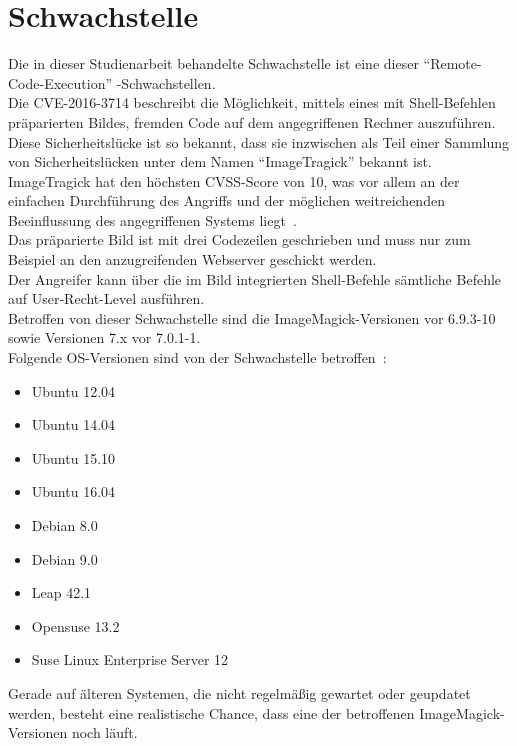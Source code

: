 \section{Schwachstelle}\label{sec:schwachstelle}

Die in dieser Studienarbeit behandelte Schwachstelle ist eine dieser "`Remote-Code-Execution"' -Schwachstellen.\\

Die CVE-2016-3714 beschreibt die Möglichkeit, mittels eines mit Shell-Befehlen präparierten Bildes, fremden Code auf dem angegriffenen Rechner auszuführen.\\

Diese Sicherheitslücke ist so bekannt, dass sie inzwischen als Teil einer Sammlung von Sicherheitslücken unter dem Namen "`ImageTragick"' bekannt ist.\\

ImageTragick hat den höchsten CVSS-Score von 10, was vor allem an der einfachen Durchführung des Angriffs und der möglichen weitreichenden Beeinflussung des angegriffenen Systems liegt~\cite{ImagemagickProductsVulnerabilities}.\\
Das präparierte Bild ist mit drei Codezeilen geschrieben und muss nur zum Beispiel an den anzugreifenden Webserver geschickt werden.\\
Der Angreifer kann über die im Bild integrierten Shell-Befehle sämtliche Befehle auf User-Recht-Level ausführen.\\

Betroffen von dieser Schwachstelle sind die ImageMagick-Versionen vor 6.9.3-10 sowie Versionen 7.x vor 7.0.1-1.\\
Folgende OS-Versionen sind von der Schwachstelle betroffen~\cite{CVE20163714EPHEMERALHTTPS}:
\begin{itemize}
    \item Ubuntu 12.04
    \item Ubuntu 14.04
    \item Ubuntu 15.10
    \item Ubuntu 16.04
    \item Debian 8.0
    \item Debian 9.0
    \item Leap 42.1
    \item Opensuse 13.2
    \item Suse Linux Enterprise Server 12
\end{itemize}
Gerade auf älteren Systemen, die nicht regelmäßig gewartet oder geupdatet werden, besteht eine realistische Chance, dass eine der betroffenen ImageMagick-Versionen noch läuft.\\